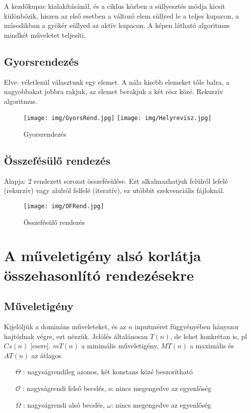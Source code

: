 \documentclass[margin=0px]{article}
\begin{document}
A kezdőkupac kialakításánál, és a ciklus közben a süllyesztés módja kicsit különbözik, hiszen az első esetben a változó elem süllyed le a teljes kupacon, a másodikban a gyökér süllyed az aktív kupacon. A képen látható algoritmus mindkét műveletet teljesíti.

\subsection{Gyorsrendezés}

Elve: véletlenül választunk egy elemet. A nála kisebb elemeket tőle balra, a nagyobbakat jobbra rakjuk, az elemet berakjuk a két rész közé. Rekurzív algoritmus.
\begin{figure}[H]
    \centering
    \texttt{[image: img/GyorsRend.jpg]}
    \texttt{[image: img/Helyrevisz.jpg]}
    \caption{Gyorsrendezés}
\end{figure}

\subsection{Összefésülő rendezés}

Alapja: 2 rendezett sorozat összefésülése. Ezt alkalmazhatjuk felülről lefelé (rekurzív) vagy alulról felfelé (iteratív), ez utóbbit szekvenciális fájloknál.
\begin{figure}[H]
    \centering
    \texttt{[image: img/OFRend.jpg]}
    \caption{Összefésülő rendezés}
\end{figure}

\section{A műveletigény alsó korlátja összehasonlító rendezésekre}

\subsection{Műveletigény}

Kijelöljük a domináns műveleteket, és az $n$ inputméret függvényében hányszor hajtódnak végre, ezt nézzük. Jelölés általánosan $T(n)$, de lehet konkrétan is, pl $Cs(n)$ [csere]. $mT(n)$ a minimális műveletigény, $MT(n)$ a maximális és $AT(n)$ az átlagos.
\begin{itemize}
    \item[$\Theta$]: nagyságrendileg azonos, két konstans közé beszorítható
    \item[$\mathcal{O}$]: nagyságrendi felső becslés, $o$: nincs megengedve az egyenlőség
    \item[$\Omega$]: nagyságrendi alsó becslés, $\omega$: nincs megengedve az egyenlőség
\end{itemize}
\end{document}
